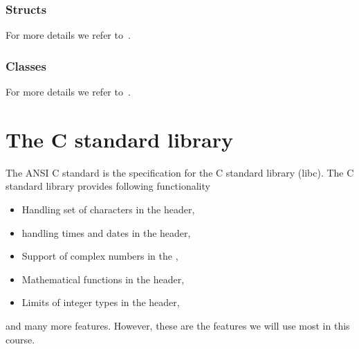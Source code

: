 \subsection{Structs}
For more details we refer to~\cite[Chapter~4]{andrew2000accelerated}.
\subsection{Classes}
For more details we refer to~\cite[Chapter~4]{andrew2000accelerated}.

\newpage
\theendnotes

\chapter{The C standard library}
\label{chapter:cpp:lib}
The ANSI C standard is the specification for the C standard library (libc). The C standard library provides following functionality
\begin{itemize}
\item Handling set of characters in the  header,
\item handling times and dates in the  header,
\item Support of complex numbers in the ,
\item Mathematical functions in the  header,
\item Limits of integer types in the  header,
\end{itemize}
and many more features. However, these are the features we will use most in this course. 

